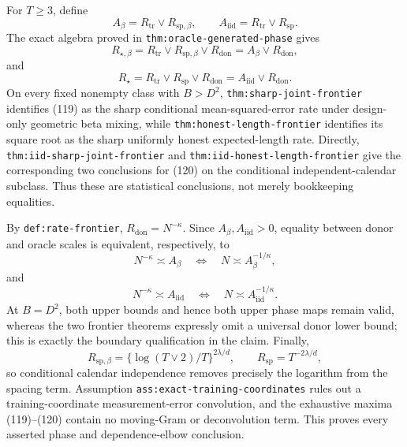 For \(T\geq3\), define
\[
A_\beta=R_{\mathrm{tr}}\vee R_{\mathrm{sp},\beta},
\qquad
A_{\mathrm{iid}}=R_{\mathrm{tr}}\vee R_{\mathrm{sp}}.
\]
The exact algebra proved in \texttt{thm:oracle-generated-phase} gives
\[
R_{\star,\beta}=R_{\mathrm{tr}}\vee R_{\mathrm{sp},\beta}\vee R_{\mathrm{don}}
=A_\beta\vee R_{\mathrm{don}},
\tag{119}
\]
and
\[
R_\star=R_{\mathrm{tr}}\vee R_{\mathrm{sp}}\vee R_{\mathrm{don}}
=A_{\mathrm{iid}}\vee R_{\mathrm{don}}.
\tag{120}
\]
On every fixed nonempty class with \(B>D^2\), \texttt{thm:sharp-joint-frontier} identifies (119) as the sharp conditional mean-squared-error rate under design-only geometric beta mixing, while \texttt{thm:honest-length-frontier} identifies its square root as the sharp uniformly honest expected-length rate.  Directly, \texttt{thm:iid-sharp-joint-frontier} and \texttt{thm:iid-honest-length-frontier} give the corresponding two conclusions for (120) on the conditional independent-calendar subclass.  Thus these are statistical conclusions, not merely bookkeeping equalities.

By \texttt{def:rate-frontier}, \(R_{\mathrm{don}}=N^{-\kappa}\).  Since \(A_\beta,A_{\mathrm{iid}}>0\), equality between donor and oracle scales is equivalent, respectively, to
\[
N^{-\kappa}\asymp A_\beta
\quad\Longleftrightarrow\quad
N\asymp A_\beta^{-1/\kappa},
\tag{121}
\]
and
\[
N^{-\kappa}\asymp A_{\mathrm{iid}}
\quad\Longleftrightarrow\quad
N\asymp A_{\mathrm{iid}}^{-1/\kappa}.
\tag{122}
\]
At \(B=D^2\), both upper bounds and hence both upper phase maps remain valid, whereas the two frontier theorems expressly omit a universal donor lower bound; this is exactly the boundary qualification in the claim.  Finally,
\[
R_{\mathrm{sp},\beta}
=\{\log(T\vee2)/T\}^{2\lambda/d},
\qquad
R_{\mathrm{sp}}=T^{-2\lambda/d},
\]
so conditional calendar independence removes precisely the logarithm from the spacing term.  Assumption \texttt{ass:exact-training-coordinates} rules out a training-coordinate measurement-error convolution, and the exhaustive maxima (119)--(120) contain no moving-Gram or deconvolution term.  This proves every asserted phase and dependence-elbow conclusion.
